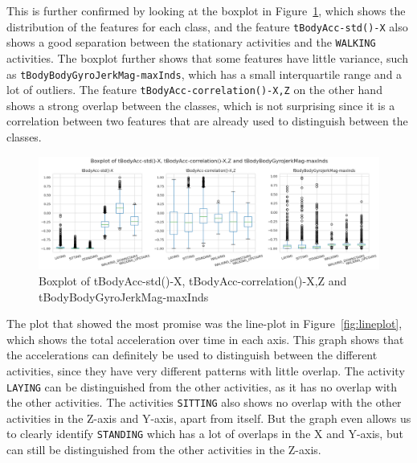 This is further confirmed by looking at the boxplot in Figure~\ref{fig:boxplot}, which shows the distribution of the features for each class, and the feature \texttt{tBodyAcc-std()-X} also shows a good separation between the stationary activities and the \texttt{WALKING} activities.
The boxplot further shows that some features have little variance, such as \texttt{tBodyBodyGyroJerkMag-maxInds}, which has a small interquartile range and a lot of outliers.
The feature \texttt{tBodyAcc-correlation()-X,Z} on the other hand shows a strong overlap between the classes, which is not surprising since it is a correlation between two features that are already used to distinguish between the classes.

\begin{figure}[ht]
    \centering
    \includegraphics[width=\textwidth]{./img/boxplot}
    \caption{Boxplot of tBodyAcc-std()-X, tBodyAcc-correlation()-X,Z and tBodyBodyGyroJerkMag-maxInds}
    \label{fig:boxplot}
\end{figure}

The plot that showed the most promise was the line-plot in Figure~\ref{fig:lineplot}, which shows the total acceleration over time in each axis.
This graph shows that the accelerations can definitely be used to distinguish between the different activities, since they have very different patterns with little overlap.
The activity \texttt{LAYING} can be distinguished from the other activities, as it has no overlap with the other activities.
The activities \texttt{SITTING} also shows no overlap with the other activities in the Z-axis and Y-axis, apart from itself.
But the graph even allows us to clearly identify \texttt{STANDING} which has a lot of overlaps in the X and Y-axis, but can still be distinguished from the other activities in the Z-axis.

